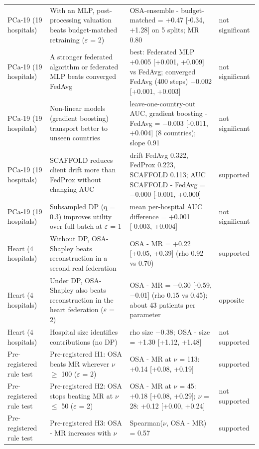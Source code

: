 \begin{table}[t]
\begin{tabular}{p{1.4cm}p{4.2cm}p{8.6cm}p{1.5cm}}
PCa-19 (19 hospitals) & With an MLP, post-processing valuation beats budget-matched retraining ($\varepsilon$ = 2) & OSA-ensemble - budget-matched = +0.47 {[}-0.34, +1.28{]} on 5 splits; MR 0.80 & not significant \\
PCa-19 (19 hospitals) & A stronger federated algorithm or federated MLP beats converged FedAvg & best: Federated MLP +0.005 {[}+0.001, +0.009{]} vs FedAvg; converged FedAvg (400 steps) +0.002 {[}+0.001, +0.003{]} & not significant \\
PCa-19 (19 hospitals) & Non-linear models (gradient boosting) transport better to unseen countries & leave-one-country-out AUC, gradient boosting - FedAvg = \ensuremath{-}0.003 {[}-0.011, +0.004{]} (8 countries); slope 0.91 & not significant \\
PCa-19 (19 hospitals) & SCAFFOLD reduces client drift more than FedProx without changing AUC & drift FedAvg 0.322, FedProx 0.223, SCAFFOLD 0.113; AUC SCAFFOLD - FedAvg = \ensuremath{-}0.000 {[}-0.001, +0.000{]} & supported \\
PCa-19 (19 hospitals) & Subsampled DP (q = 0.3) improves utility over full batch at $\varepsilon$ = 1 & mean per-hospital AUC difference = +0.001 {[}-0.003, +0.004{]} & not significant \\
Heart (4 hospitals) & Without DP, OSA-Shapley beats reconstruction in a second real federation & OSA - MR = +0.22 {[}+0.05, +0.39{]} (rho 0.92 vs 0.70) & supported \\
Heart (4 hospitals) & Under DP, OSA-Shapley also beats reconstruction in the heart federation ($\varepsilon$ = 2) & OSA - MR = \ensuremath{-}0.30 {[}-0.59, \ensuremath{-}0.01{]} (rho 0.15 vs 0.45); about 43 patients per parameter & opposite \\
Heart (4 hospitals) & Hospital size identifies contributions (no DP) & rho size \ensuremath{-}0.38; OSA - size = +1.30 {[}+1.12, +1.48{]} & not supported \\
Pre-registered rule test & Pre-registered H1: OSA beats MR wherever $\nu$ $\ge$ 100 ($\varepsilon$ = 2) & OSA - MR at $\nu$ = 113: +0.14 {[}+0.08, +0.19{]} & supported \\
Pre-registered rule test & Pre-registered H2: OSA stops beating MR at $\nu$ $\le$ 50 ($\varepsilon$ = 2) & OSA - MR at $\nu$ = 45: +0.18 {[}+0.08, +0.29{]}; $\nu$ = 28: +0.12 {[}+0.00, +0.24{]} & not supported \\
Pre-registered rule test & Pre-registered H3: OSA - MR increases with $\nu$ & Spearman($\nu$, OSA - MR) = 0.57 & supported \\

\end{tabular}
\end{table}

